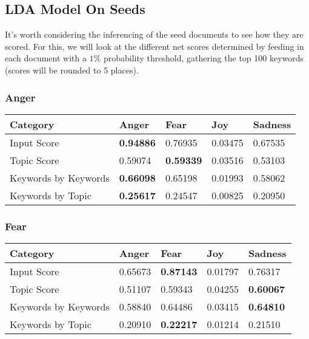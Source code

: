 \documentclass[11pt, twoside, reqno]{book}
\begin{document}
\subsection{LDA Model On Seeds}

It's worth considering the inferencing of the seed documents to see how they are scored. For this, we will look at the different net scores determined by feeding in each document with a $1\%$ probability threshold, gathering the top 100 keywords (scores will be rounded to 5 places).

\subsubsection{\textbf{Anger}}

\begin{table}[h!]
    \raggedright
    \begin{tabular}{|l|l|l|l|l|}
    \hline
    Category & Anger & Fear & Joy & Sadness \\\hline
    Input Score & \textbf{0.94886} & 0.76935 & 0.03475 & 0.67535 \\\hline
    Topic Score & 0.59074 & \textbf{0.59339} & 0.03516 & 0.53103 \\\hline
    Keywords by Keywords & \textbf{0.66098} & 0.65198 & 0.01993 & 0.58062 \\\hline
    Keywords by Topic & \textbf{0.25617} & 0.24547 & 0.00825 & 0.20950 \\\hline
    \end{tabular}
\end{table}

\subsubsection{\textbf{Fear}}

\begin{table}[h!]
    \raggedright
    \begin{tabular}{|l|l|l|l|l|}
    \hline
    Category & Anger & Fear & Joy & Sadness \\\hline
    Input Score & 0.65673 & \textbf{0.87143} & 0.01797 & 0.76317 \\\hline
    Topic Score & 0.51107 & 0.59343 & 0.04255 & \textbf{0.60067} \\\hline
    Keywords by Keywords & 0.58840 & 0.64486 & 0.03415 & \textbf{0.64810} \\\hline
    Keywords by Topic & 0.20910 & \textbf{0.22217} & 0.01214 & 0.21510 \\\hline
    \end{tabular}
\end{table}
\end{document}
